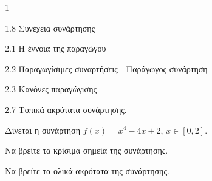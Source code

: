 \begin{ylh}{1}
    \item 1.8 Συνέχεια συνάρτησης
    \item 2.1 Η έννοια της παραγώγου
    \item 2.2 Παραγωγίσιμες συναρτήσεις - Παράγωγος συνάρτηση
    \item 2.3 Κανόνες παραγώγισης
    \item 2.7 Τοπικά ακρότατα συνάρτησης.
\end{ylh}
Δίνεται η συνάρτηση $f(x) = x^4 - 4x + 2$, $x \in [0,2]$.
\begin{alist}
\item Να βρείτε τα κρίσιμα σημεία της συνάρτησης. 
\item Να βρείτε τα ολικά ακρότατα της συνάρτησης. 
\end{alist}